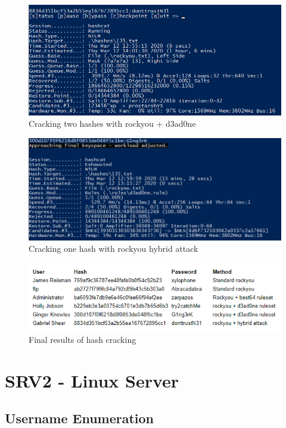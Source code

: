 \documentclass{report}
\begin{document}
\begin{figure}[!htb]
	\centering
	\includegraphics[scale=0.6]{img/hashdump4.png}
	\caption{Cracking two hashes with rockyou + d3ad0ne}
\end{figure}
\begin{figure}[!htb]
	\centering
	\includegraphics[scale=0.6]{img/hashdump5.png}
	\caption{Cracking one hash with rockyou hybrid attack}
\end{figure}
\begin{figure}[!htb]
	\centering
	\includegraphics[scale=0.6]{img/hashdump6.png}
	\caption{Final results of hash cracking}
\end{figure}
\pagebreak



\section{SRV2 - Linux Server}
\subsection{Username Enumeration}
\end{document}
